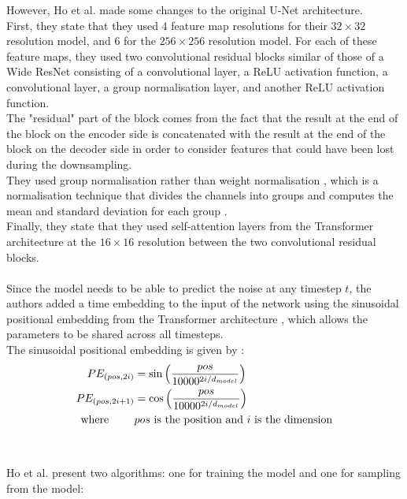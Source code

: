 \documentclass{article}
\begin{document}
However, Ho et al. \cite{ho2020denoising} made some changes to the original U-Net architecture. \\
First, they state that they used 4 feature map resolutions for their $32 \times 32$ resolution model, and 6 for the $256 \times 256$ resolution model. For each of these feature maps, they used two convolutional residual blocks similar of those of a Wide ResNet \cite{zagoruyko2017wide} consisting of a convolutional layer, a ReLU activation function, a convolutional layer, a group normalisation layer, and another ReLU activation function. \\ 
The "residual" part of the block comes from the fact that the result at the end of the block on the encoder side is concatenated with the result at the end of the block on the decoder side in order to consider features that could have been lost during the downsampling. \cite{lai2022rethinking} \\
They used group normalisation \cite{wu2018group} rather than weight normalisation \cite{salimans2016weight}, which is a normalisation technique that divides the channels into groups and computes the mean and standard deviation for each group \cite{ho2020denoising}. \\
Finally, they state that they used self-attention layers from the Transformer architecture \cite{vaswani2023attention} at the $16 \times 16$ resolution between the two convolutional residual blocks. \cite{ho2020denoising}
\\\\
Since the model needs to be able to predict the noise at any timestep $t$, the authors added a time embedding to the input of the network using the sinusoidal positional embedding from the Transformer architecture \cite{vaswani2023attention}, which allows the parameters to be shared across all timesteps. \\
The sinusoidal positional embedding is given by \cite{vaswani2023attention}:
\begin{align}
  PE_{(pos, 2i)} &= \sin \left( \frac{pos}{10000^{2i/d_{model}}} \right) \\
  PE_{(pos, 2i+1)} &= \cos \left( \frac{pos}{10000^{2i/d_{model}}} \right) \\
  \text{where } \qquad & pos \text{ is the position and } i \text{ is the dimension} \notag
\end{align}
\\\\
Ho et al. \cite{ho2020denoising} present two algorithms: one for training the model and one for sampling from the model:
\end{document}
